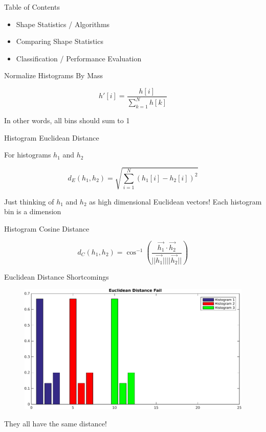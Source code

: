 \documentclass{beamer}
\begin{document}
\begin{frame}{Table of Contents}
\begin{itemize}[label=$\vartriangleright$]
	\item Shape Statistics / Algorithms
\end{itemize}
\begin{itemize}[label=$\blacktriangleright$]
	\item Comparing Shape Statistics
\end{itemize}
\begin{itemize}[label=$\vartriangleright$]
	\item Classification / Performance Evaluation
\end{itemize}
\end{frame}


\begin{frame}{Normalize Histograms By Mass}


\[ h'[i] = \frac{h[i]}{\sum_{k=1}^N h[k]} \]

In other words, all bins should sum to 1

\end{frame}

\begin{frame}{Histogram Euclidean Distance}

For histograms $h_1$ and $h_2$

\[ d_E(h_1, h_2) = \sqrt{ \sum_{i=1}^N (h_1[i] - h_2[i])^2 } \]

Just thinking of $h_1$ and $h_2$ as high dimensional Euclidean vectors!  Each histogram bin is a dimension

\end{frame}

\begin{frame}{Histogram Cosine Distance}

\[ d_C(h_1, h_2) = \cos^{-1}\left(  \frac{ \vec{h_1} \cdot \vec{h_2} }{ ||\vec{h_1}|| ||\vec{h_2}|| } \right) \]

\end{frame}


\begin{frame}{Euclidean Distance Shortcomings}

\begin{figure}[t]
	\centering
    \includegraphics[width=\textwidth]{EuclidHistFail.pdf}
\end{figure}

They all have the same distance!

\end{frame}
\end{document}
